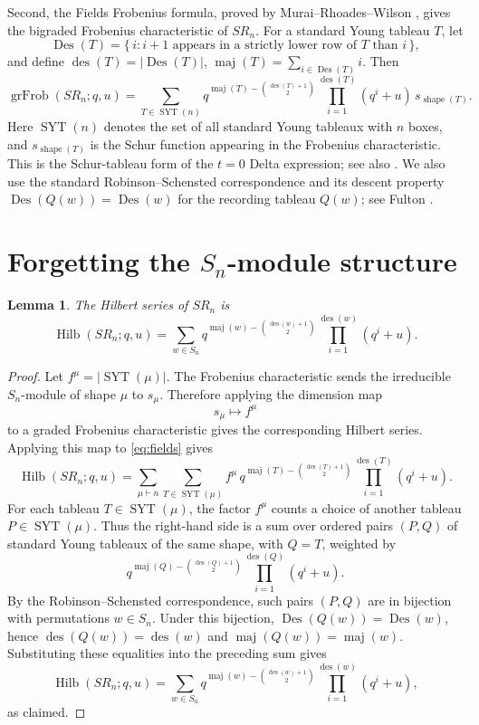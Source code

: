 \documentclass[12pt]{article}
\newtheorem{lemma}[theorem]{Lemma}
\DeclareMathOperator{\Hilb}{Hilb}
\DeclareMathOperator{\grFrob}{grFrob}
\DeclareMathOperator{\Des}{Des}
\DeclareMathOperator{\des}{des}
\DeclareMathOperator{\maj}{maj}
\DeclareMathOperator{\shape}{shape}
\newcommand{\SYT}{\operatorname{SYT}}
\begin{document}
Second, the Fields Frobenius formula, proved by Murai--Rhoades--Wilson \cite{MRW2025}, gives the bigraded Frobenius characteristic of \(SR_n\).  For a standard Young tableau \(T\), let
\[
\Des(T)=\{\,i: i+1 \text{ appears in a strictly lower row of }T\text{ than }i\,\},
\]
and define \(\des(T)=|\Des(T)|\), \(\maj(T)=\sum_{i\in\Des(T)}i\).  Then
\begin{equation}\label{eq:fields}
\grFrob(SR_n;q,u)
=
\sum_{T\in \SYT(n)}
q^{\maj(T)-\binom{\des(T)+1}{2}}
\prod_{i=1}^{\des(T)}(q^i+u)\,
s_{\shape(T)}.
\end{equation}
Here \(\SYT(n)\) denotes the set of all standard Young tableaux with \(n\) boxes, and \(s_{\shape(T)}\) is the Schur function appearing in the Frobenius characteristic.  This is the Schur-tableau form of the \(t=0\) Delta expression; see also \cite{HRS2019}.  We also use the standard Robinson--Schensted correspondence and its descent property \(\Des(Q(w))=\Des(w)\) for the recording tableau \(Q(w)\); see Fulton \cite{Fulton1997}.

\section{Forgetting the \(S_n\)-module structure}

\begin{lemma}\label{lem:permutation-hilbert}
The Hilbert series of \(SR_n\) is
\[
\Hilb(SR_n;q,u)
=
\sum_{w\in S_n}
q^{\maj(w)-\binom{\des(w)+1}{2}}
\prod_{i=1}^{\des(w)}(q^i+u).
\]
\end{lemma}

\begin{proof}
Let \(f^\mu=|\SYT(\mu)|\).  The Frobenius characteristic sends the irreducible \(S_n\)-module of shape \(\mu\) to \(s_\mu\).  Therefore applying the dimension map
\[
s_\mu\longmapsto f^\mu
\]
to a graded Frobenius characteristic gives the corresponding Hilbert series.  Applying this map to \eqref{eq:fields} gives
\[
\Hilb(SR_n;q,u)
=
\sum_{\mu\vdash n}
\sum_{T\in \SYT(\mu)}
f^\mu\,
q^{\maj(T)-\binom{\des(T)+1}{2}}
\prod_{i=1}^{\des(T)}(q^i+u).
\]
For each tableau \(T\in\SYT(\mu)\), the factor \(f^\mu\) counts a choice of another tableau \(P\in\SYT(\mu)\).  Thus the right-hand side is a sum over ordered pairs \((P,Q)\) of standard Young tableaux of the same shape, with \(Q=T\), weighted by
\[
q^{\maj(Q)-\binom{\des(Q)+1}{2}}
\prod_{i=1}^{\des(Q)}(q^i+u).
\]
By the Robinson--Schensted correspondence, such pairs \((P,Q)\) are in bijection with permutations \(w\in S_n\).  Under this bijection, \(\Des(Q(w))=\Des(w)\), hence \(\des(Q(w))=\des(w)\) and \(\maj(Q(w))=\maj(w)\).  Substituting these equalities into the preceding sum gives
\[
\Hilb(SR_n;q,u)
=
\sum_{w\in S_n}
q^{\maj(w)-\binom{\des(w)+1}{2}}
\prod_{i=1}^{\des(w)}(q^i+u),
\]
as claimed.
\end{proof}
\end{document}
